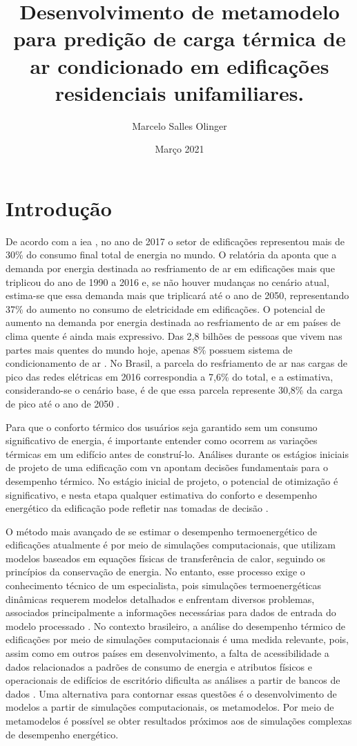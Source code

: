 \documentclass{article}
\title{Desenvolvimento de metamodelo para predição de carga térmica de ar condicionado em edificações residenciais unifamiliares.}
\author{Marcelo Salles Olinger}
\date{Março 2021}
\begin{document}
\maketitle

\section{Introdução}

De acordo com a \acrfull{iea} \citep{IEA2018a}, no ano de 2017 o setor de edificações representou mais de 30\% do consumo final total de energia no mundo. 
O relatória da \citet{IEA2018} aponta que a demanda por energia destinada ao resfriamento de ar em edificações mais que triplicou do ano de 1990 a 2016 e, se não houver mudanças no cenário atual, estima-se que essa demanda mais que triplicará até o ano de 2050, representando 37\% do aumento no consumo de eletricidade em edificações. 
O potencial de aumento na demanda por energia destinada ao resfriamento de ar em países de clima quente é ainda mais expressivo. Das 2,8 bilhões de pessoas que vivem nas partes mais quentes do mundo hoje, apenas 8\% possuem sistema de condicionamento de ar \citep{IEA2018}. No Brasil, a parcela do resfriamento de ar nas cargas de pico das redes elétricas em 2016 correspondia a 7,6\% do total, e a estimativa, considerando-se o cenário base, é de que essa parcela represente 30,8\% da carga de pico até o ano de 2050 \citep{IEA2018}. 

Para que o conforto térmico dos usuários seja garantido sem um consumo significativo de energia, é importante entender como ocorrem as variações térmicas em um edifício antes de construí-lo. Análises durante os estágios iniciais de projeto de uma edificação com \acrlong{vn} apontam decisões fundamentais para o desempenho térmico. No estágio inicial de projeto, o potencial de otimização é significativo, e nesta etapa qualquer estimativa do conforto e desempenho energético da edificação pode refletir nas tomadas de decisão \citep{Belleri2014, Roetzel2014}.

O método mais avançado de se estimar o desempenho termoenergético de edificações atualmente é por meio de simulações computacionais, que utilizam modelos baseados em equações físicas de transferência de calor, seguindo os princípios da conservação de energia.
No entanto, esse processo exige o conhecimento técnico de um especialista, pois simulações termoenergéticas dinâmicas requerem modelos detalhados e enfrentam diversos problemas, associados principalmente a informações necessárias para dados de entrada do modelo processado \citep{Corgnati2013}. No contexto brasileiro, a análise do desempenho térmico de edificações por meio de simulações computacionais é uma medida relevante, pois, assim como em outros países em desenvolvimento, a falta de acessibilidade a dados relacionados a padrões de consumo de energia e atributos físicos e operacionais de edifícios de escritório dificulta as análises a partir de bancos de dados \citep{Alves2018}. Uma alternativa para contornar essas questões é o desenvolvimento de modelos a partir de simulações computacionais, os metamodelos. Por meio de metamodelos é possível se obter resultados próximos aos de simulações complexas de desempenho energético.
\end{document}
